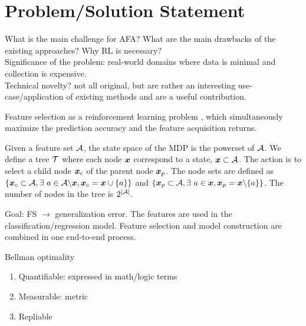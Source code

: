 \section{Problem/Solution Statement}
What is the main challenge for AFA? What are the main drawbacks of the existing approaches? Why RL is necessary?\\

Significance of the problem: real-world domains where data is minimal and collection is expensive.\\

Technical novelty? not all original, but are rather an interesting use-case/application of existing methods and are a useful contribution.\\ 


Feature selection as a reinforcement learning problem \citep{gaudel_feature_2010}, which simultaneously maximize the prediction accuracy and the feature acquisition returns.

Given a feature set $\mathcal{A}$, the state space of the MDP is the powerset of $\mathcal{A}$. We define a tree $\mathcal{T}$ where each node $\bm x$ correspond to a state, $\bm x \subset \mathcal{A}$. The action is to select a child node $\bm x_c$ of the parent node $\bm x_p$. The node sets are defined as $\{\bm x_c \subset \mathcal{A}, \exists ~ a \in \mathcal{A} \backslash \bm x, \bm x_c = \bm x \cup \{a\}\}$ and $\{\bm x_p \subset \mathcal{A}, \exists ~ a \in \bm x, \bm x_p = \bm x \backslash \{a\}\}$. The number of nodes in the tree is $2^{|\mathcal{A}|}$.

Goal: FS $\rightarrow$ generalization error. The features are used in the classification/regression model. Feature selection and model construction are combined in one end-to-end process.


Bellman optimality

\begin{enumerate}
\item
Quantifiable: expressed in math/logic terms
\item
Measurable: metric
\item
Repliable
\end{enumerate}

